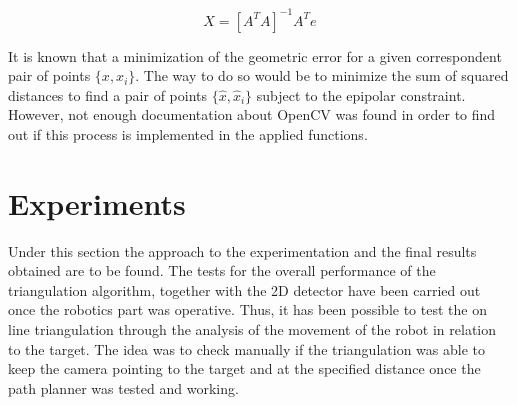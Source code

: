 \begin{equation}
	X = [A^{T}A]^{-1}A^{T}e
	\label{eq:LSM_solution}
\end{equation}

It is known that a minimization of the geometric error for a given correspondent pair of points $\{x, x_i\}$.
The way to do so would be to minimize the sum of squared distances to find a pair of points $\{\hat{x}, \hat{x}_i\}$ subject to the epipolar constraint.
However, not enough documentation about OpenCV was found in order to find out if this process is implemented in the applied functions.

\section{Experiments}
Under this section the approach to the experimentation and the final results obtained are to be found.
The tests for the overall performance of the triangulation algorithm, together with the 2D detector have been carried out once the robotics part was operative.
Thus, it has been possible to test the on line triangulation through the analysis of the movement of the robot in relation to the target.
The idea was to check manually if the triangulation was able to keep the camera pointing to the target and at the specified distance once the path planner was tested and working.
